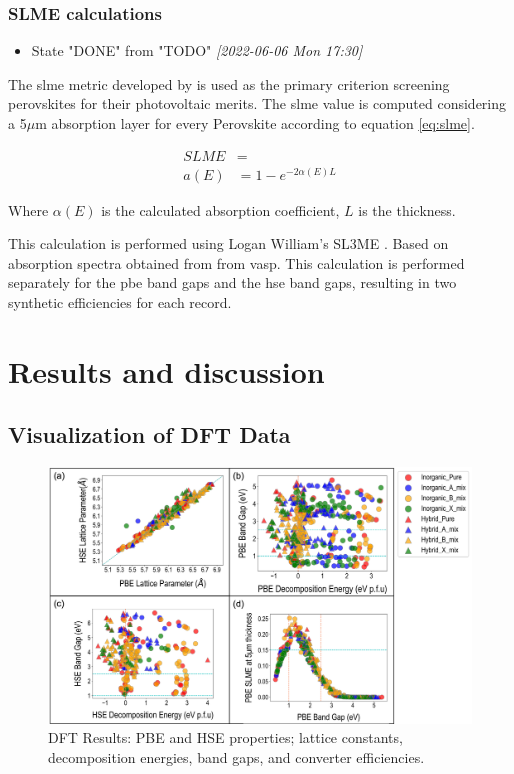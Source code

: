 \documentclass[twoside, twocolumn, 9pt, draft]{article}
\begin{document}
\subsubsection*{SLME calculations}
\label{sec:org8181ddd}
\begin{itemize}
\item State "DONE"       from "TODO"       \textit{[2022-06-06 Mon 17:30]}
\end{itemize}
The \gls{slme} metric developed by \citet{yu-2012-ident-poten} is used as the
primary criterion screening perovskites for their photovoltaic
merits. The \gls{slme} value is computed considering a 5\(\mu\)m absorption
layer for every Perovskite according to equation \eqref{eq:slme}.

\begin{equation}\label{eq:slme}
\begin{align*}
SLME&= \\
a(E)&=1-e^{-2\alpha(E)L}
\end{align*}
\end{equation}

Where \(\alpha(E)\) is the calculated absorption coefficient, \(L\) is
the thickness.

This calculation is performed using Logan William's SL3ME
\cite{williams-2022-sl3me}. Based on absorption spectra obtained from
from \gls{vasp}. This calculation is performed separately for the \acrshort{pbe} band
gaps and the \acrshort{hse} band gaps, resulting in two synthetic efficiencies
for each record.

\section*{Results and discussion}
\label{sec:org2f99e00}
\subsection*{Visualization of DFT Data}
\label{sec:orgbcb58cd}
\begin{figure}
\centering
\includegraphics[width=.9\linewidth]{./figs/screening_properties.png}
\caption{\label{fig:pairplots} DFT Results: PBE and HSE properties; lattice constants, decomposition energies, band gaps, and converter efficiencies.}
\end{figure}
\end{document}
